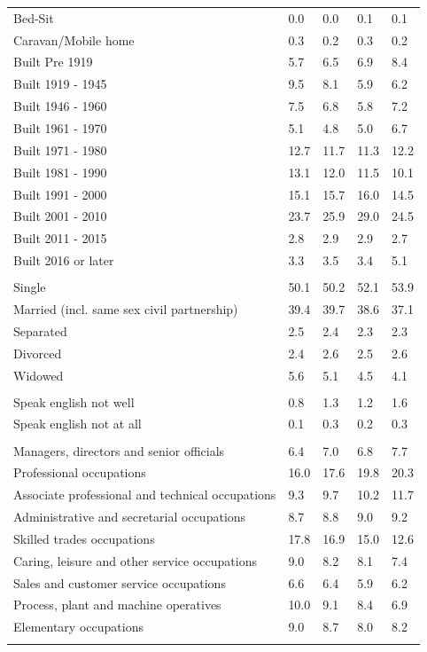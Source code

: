\documentclass{article}
\begin{document}
\begin{table}[h]
\begin{tabular}{KTTTT}
Bed-Sit & 0.0& 0.0& 0.1& 0.1\\
Caravan/Mobile home & 0.3& 0.2& 0.3& 0.2\\
    \hline
Built Pre 1919 & 5.7& 6.5& 6.9& 8.4\\
Built 1919 - 1945 & 9.5& 8.1& 5.9& 6.2\\
Built  1946 - 1960 & 7.5& 6.8& 5.8& 7.2\\
Built  1961 - 1970 & 5.1& 4.8& 5.0& 6.7\\
Built  1971 - 1980 & 12.7& 11.7& 11.3& 12.2\\
Built  1981 - 1990 & 13.1& 12.0& 11.5& 10.1\\
Built  1991 - 2000 & 15.1& 15.7& 16.0& 14.5\\
Built  2001 - 2010 & 23.7& 25.9& 29.0& 24.5\\
Built  2011 - 2015 & 2.8& 2.9& 2.9& 2.7\\
Built  2016 or later & 3.3& 3.5& 3.4& 5.1\\
\hline
    \\
    \hline
Single & 50.1& 50.2& 52.1& 53.9\\
Married (incl. same sex civil partnership) & 39.4& 39.7& 38.6& 37.1\\
Separated  & 2.5& 2.4& 2.3& 2.3\\
Divorced  & 2.4& 2.6& 2.5& 2.6\\
Widowed & 5.6& 5.1& 4.5& 4.1\\
\hline
    \\ 
    \hline
Speak english not well & 0.8& 1.3& 1.2& 1.6\\
Speak english not at all & 0.1& 0.3& 0.2& 0.3\\
\hline
    \\
    \hline
Managers, directors and senior officials & 6.4& 7.0& 6.8& 7.7\\
Professional occupations & 16.0& 17.6& 19.8& 20.3\\
Associate professional and technical occupations &  9.3&  9.7& 10.2& 11.7\\
Administrative and secretarial occupations & 8.7& 8.8& 9.0& 9.2\\
Skilled trades occupations & 17.8& 16.9& 15.0& 12.6\\
Caring, leisure and other service occupations & 9.0& 8.2& 8.1& 7.4\\
Sales and customer service occupations & 6.6& 6.4& 5.9& 6.2\\
Process, plant and machine operatives & 10.0&  9.1&  8.4&  6.9\\
Elementary occupations & 9.0& 8.7& 8.0& 8.2\\
\hline
\end{tabular}
\end{table}
\end{document}
